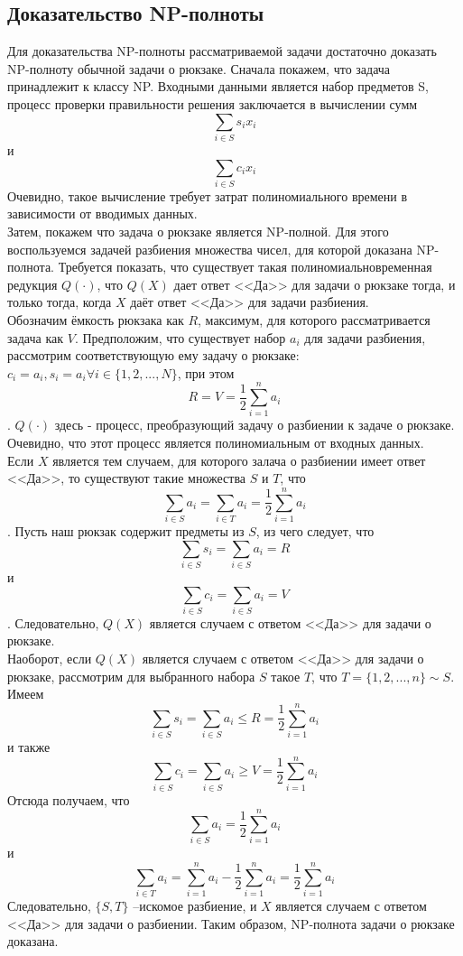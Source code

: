 \subsection{Доказательство NP-полноты}
Для доказательства NP-полноты рассматриваемой задачи достаточно доказать NP-полноту обычной задачи о рюкзаке.
Сначала покажем, что задача принадлежит к классу NP. Входными данными является набор предметов S, процесс проверки правильности решения заключается в вычислении сумм \[\sum_{i\in S}{s_i x_i}\] и  \[\sum_{i\in S}{c_{i} x_i}\] Очевидно, такое вычисление требует затрат полиномиального времени в зависимости от вводимых данных.\\ 
Затем, покажем что задача о рюкзаке является NP-полной. Для этого воспользуемся задачей разбиения множества чисел, для которой доказана NP-полнота. 
Требуется показать, что существует такая полиномиальновременная редукция $Q(\cdot)$, что $Q(X)$ дает ответ <<Да>> для задачи о рюкзаке тогда, и только тогда, когда $X$ даёт ответ <<Да>> для задачи разбиения.\\
Обозначим ёмкость рюкзака как $R$, максимум, для которого рассматривается задача как $V$. 
Предположим, что существует набор $a_i$ для задачи разбиения, рассмотрим соответствующую ему задачу о рюкзаке:$c_i=a_i, s_i=a_i \forall i\in\{1,2,...,N\}$, при этом \[R=V=\frac{1}{2}\sum_{i=1}^{n}a_i\]. $Q(\cdot)$ здесь - процесс, преобразующий задачу о разбиении к задаче о рюкзаке. Очевидно, что этот процесс является полиномиальным от входных данных.\\
Если $X$ является тем случаем, для которого залача о разбиении имеет ответ  <<Да>>, то существуют такие множества $S$ и $T$, что
\[\sum_{i\in S}a_i=\sum_{i\in T}a_i=\frac{1}{2}\sum_{i=1}^{n}a_i\].
Пусть наш рюкзак содержит предметы из $S$, из чего следует, что \[\sum_{i\in S}s_i=\sum_{i\in S}a_i=R\] и \[\sum_{i\in S}c_i=\sum_{i\in S}a_i=V\]. Следовательно, $Q(X)$ является случаем с ответом <<Да>> для задачи о рюкзаке.\\
Наоборот, если $Q(X)$ является случаем с ответом <<Да>> для задачи о рюкзаке, рассмотрим для выбранного набора $S$ такое $T$, что $T=\{1,2,...,n\}\sim S$. 
Имеем \[\sum_{i\in S}s_i=\sum_{i\in S}a_i\leq R=\frac{1}{2}\sum_{i=1}^{n}a_i\] 
и также \[\sum_{i\in S}c_i=\sum_{i\in S}a_i\geq V=\frac{1}{2}\sum_{i=1}^{n}a_i\]
Отсюда получаем, что \[\sum_{i\in S}a_i=\frac{1}{2}\sum_{i=1}^{n}a_i\] 
и \[\sum_{i\in T}a_i=\sum_{i=1}^{n}a_i-\frac{1}{2}\sum_{i=1}^{n}a_i=\frac{1}{2}\sum_{i=1}^{n}a_i\]
Следовательно, $\{S,T\}$ --искомое разбиение, и $X$ является случаем с ответом <<Да>> для задачи о разбиении. Таким образом, NP-полнота задачи о рюкзаке доказана.


